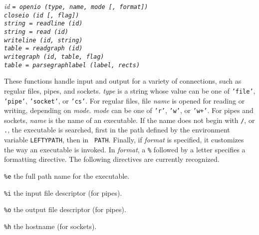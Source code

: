 \begin{flushleft}
\it id \tt= openio (\it type, name, mode [, format]\/\tt )\\
\tt closeio (\it id [, flag]\/\tt )\\
\it string \tt = readline (\it id\tt )\\
\it string \tt = read (\it id\tt )\\
\tt writeline (\it id, string\tt )\\
\it table \tt = readgraph (\it id\tt )\\
\tt writegraph (\it id, table, flag\tt )\\
\it table \tt = parsegraphlabel (\it label, rects\tt )\\
\end{flushleft}\vspace{-2\itemsep}
These functions handle input and output for a variety of connections, such as
regular files, pipes, and sockets. {\it type} is a string whose value can be
one of {\tt 'file'}, {\tt 'pipe'}, {\tt 'socket'}, or {\tt 'cs'}. For regular
files, file {\it name} is opened for reading or writing, depending on {\it
mode}.  {\it mode} can be one of {\tt 'r'}, {\tt 'w'}, or {\tt 'w+'}. For pipes
and sockets, {\it name} is the name of an executable. If the name does not
begin with {\tt /}, or {\tt .}, the executable is searched, first in the path
defined by the environment variable {\tt LEFTYPATH}, then in {\tt
PATH}. Finally, if {\it format} is specified, it customizes the way an
executable is invoked. In {\it format}, a {\tt \%} followed by a letter
specifies a formatting directive. The following directives are currently
recognized.

\begin{list}{}{}
\item[\tt \%e]
the full path name for the executable.
\item[\tt \%i]
the input file descriptor (for pipes).
\item[\tt \%o]
the output file descriptor (for pipes).
\item[\tt \%h]
the hostname (for sockets).
\end{list}

